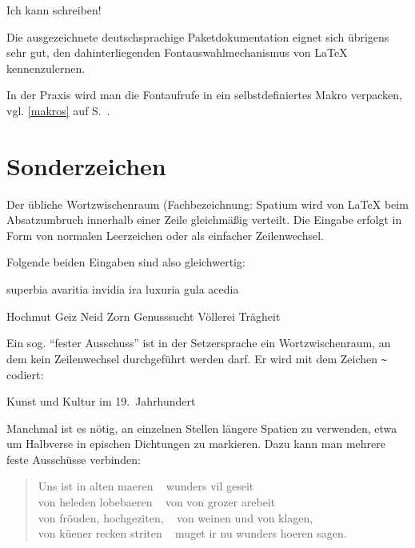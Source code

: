 \begin{lfgwexample}{}
{
\huge
Ich kann schreiben!}
\end{lfgwexample}

Die ausgezeichnete deutschsprachige Paketdokumentation eignet sich übrigens sehr gut,
den dahinterliegenden Fontauswahlmechanismus von \LaTeX{} kennenzulernen.

In der Praxis wird man die Fontaufrufe in ein selbstdefiniertes Makro verpacken, 
vgl. \ref{makros} auf S.~\pageref{makros}.


\section{Sonderzeichen}


Der übliche Wortzwischenraum (Fachbezeichnung: Spatium 
 wird von \LaTeX{} beim Absatzumbruch innerhalb einer Zeile
gleichmäßig verteilt. Die Eingabe erfolgt in Form von normalen Leerzeichen oder als 
einfacher Zeilenwechsel.

Folgende beiden Eingaben sind also gleichwertig:

\begin{lfgwexample}{}
 superbia avaritia invidia ira luxuria gula acedia
 
 Hochmut
 Geiz
 Neid
 Zorn 
 Genusssucht
 Völlerei
 Trägheit
\end{lfgwexample}

Ein sog. \enquote{fester Ausschuss} ist in der Setzersprache ein Wortzwischenraum, an dem 
kein Zeilenwechsel durchgeführt werden darf. Er wird mit dem Zeichen \lstinline/~/
codiert:

\begin{lfgwexample}{}
 Kunst und Kultur im 19.~Jahrhundert
\end{lfgwexample}

Manchmal ist es nötig, an einzelnen Stellen längere Spatien zu verwenden, etwa um Halbverse 
in epischen Dichtungen zu markieren. Dazu kann man mehrere feste Ausschüsse verbinden:

\begin{lfgwcode}{}
 \begin{verse}
 Uns ist in alten maeren ~ wunders vil geseit\\
 von heleden lobebaeren ~ von von grozer arebeit\\
 von fröuden, hochgeziten, ~ von weinen und von klagen,\\
 von küener recken striten ~ muget ir nu wunders hoeren sagen.
 \end{verse}
\end{lfgwcode}


